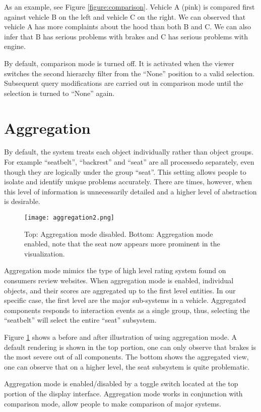 As an example, see Figure \ref{figure:comparison}. Vehicle A (pink) is compared
first against vehicle B on the left and vehicle C on the right. We can observed
that vehicle A has more complaints about the hood than both B and C. We can also
infer that B has serious problems with brakes and C has serious problems with
engine.
 
By default, comparison mode is turned off. It is activated when the viewer
switches the second hierarchy filter from the ``None'' position to a valid
selection. Subsequent query modifications are carried out in comparison mode
until the selection is turned to ``None'' again.


 
 
 
\section{Aggregation}
By default, the system treats each object individually rather than object
groups. For example ``seatbelt'', ``backrest'' and ``seat'' are all processedo
separately, even though they are logically under the group ``seat''. This
setting allows people to isolate and identify unique problems accurately. There
are times, however, when this level of information is unnecessarily detailed and
a higher level of abstraction is desirable.

	\begin{figure}
	 \centering  
	 \texttt{[image: aggregation2.png]}
	 \caption[Aggregation View]{Top: Aggregation mode disabled. Bottom: Aggregation
	 mode enabled, note that the seat now appears more prominent in the visualization.}
	 \label{figure:aggregation}
	\end{figure}
	
Aggregation mode mimics the type of high level rating system found on consumers
review websites. When aggregation mode is enabled, individual objects, and their
scores are aggregated up to the first level entities. In our specific case, the 
first level are the major sub-systems in a vehicle. Aggregated components
responds to interaction events as a single group, thus, selecting the
``seatbelt'' will select the entire ``seat'' subsystem.

 
Figure \ref{figure:aggregation} shows a before and after illustration of using
aggregation mode. A default rendering is shown in the top portion, one can
only observe that brakes is the most severe out of all components. The bottom
shows the aggregated view, one can observe that on a higher level, the seat
subsystem is quite problematic.
 
Aggregation mode is enabled/disabled by a toggle switch located at the top
portion of the display interface. Aggregation mode works in
conjunction with comparison mode, allow people to make comparison of major
systems.
